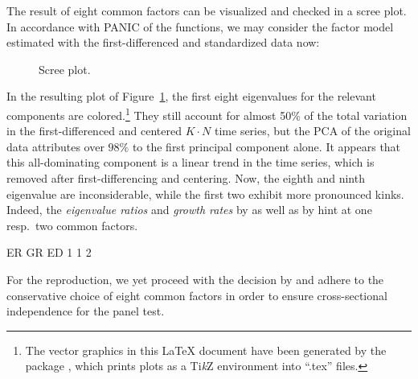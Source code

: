 The result of eight common factors can be visualized and checked in a scree plot. In accordance with PANIC of the  functions, we may consider the factor model estimated with the first-differenced and standardized data now: 
\begin{CodeChunk}
\end{CodeChunk}
\begin{figure}[ht] %
	\centering
	\caption{Scree plot.}
	\resizebox{0.8\textwidth}{!}{
		}
	\label{fig:Scree}
\end{figure}
In the resulting plot of Figure~\ref{fig:Scree}, the first eight eigenvalues for the relevant components are colored.\footnote{The vector graphics in this LaTeX document have been generated by the  package \citep{SharpsteenEtAl2020}, which prints  plots as a Ti\textit{k}Z environment into ``.tex'' files.} They still account for almost 50\% of the total variation in the first-differenced and centered $K \cdot N$ time series, but the PCA of the original data attributes over $ 98\% $ to the first principal component alone. It appears that this all-dominating component is a linear trend in the time series, which is removed after first-differencing and centering. Now, the eighth and ninth eigenvalue are inconsiderable, while the first two exhibit more pronounced kinks. Indeed, the \textit{eigenvalue ratios}  and \textit{growth rates}  by \citet{AhnHorenstein2013} as well as  by \citet{Onatski2010} hint at one resp.~two common factors.
\begin{CodeChunk}
\begin{CodeOutput}
ER GR ED 
1  1  2 
\end{CodeOutput}
\end{CodeChunk}
For the reproduction, we yet proceed with the decision by \citet{OersalArsova2017} and adhere to the conservative choice of eight common factors in order to ensure cross-sectional independence for the panel test.


